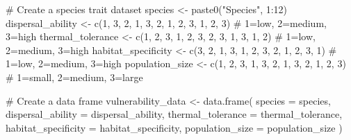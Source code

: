 \documentclass[
  letterpaper,
]{book}
\newenvironment{Shaded}{\begin{snugshade}}{\end{snugshade}}
\newcommand{\AttributeTok}[1]{\textcolor[rgb]{0.40,0.45,0.13}{#1}}
\newcommand{\CommentTok}[1]{\textcolor[rgb]{0.37,0.37,0.37}{#1}}
\newcommand{\DecValTok}[1]{\textcolor[rgb]{0.68,0.00,0.00}{#1}}
\newcommand{\FunctionTok}[1]{\textcolor[rgb]{0.28,0.35,0.67}{#1}}
\newcommand{\NormalTok}[1]{\textcolor[rgb]{0.00,0.23,0.31}{#1}}
\newcommand{\OtherTok}[1]{\textcolor[rgb]{0.00,0.23,0.31}{#1}}
\newcommand{\SpecialCharTok}[1]{\textcolor[rgb]{0.37,0.37,0.37}{#1}}
\newcommand{\StringTok}[1]{\textcolor[rgb]{0.13,0.47,0.30}{#1}}
\begin{document}
\begin{Shaded}
\begin{Highlighting}[]
\CommentTok{\# Create a species trait dataset}
\NormalTok{species }\OtherTok{\textless{}{-}} \FunctionTok{paste0}\NormalTok{(}\StringTok{"Species"}\NormalTok{, }\DecValTok{1}\SpecialCharTok{:}\DecValTok{12}\NormalTok{)}
\NormalTok{dispersal\_ability }\OtherTok{\textless{}{-}} \FunctionTok{c}\NormalTok{(}\DecValTok{1}\NormalTok{, }\DecValTok{3}\NormalTok{, }\DecValTok{2}\NormalTok{, }\DecValTok{1}\NormalTok{, }\DecValTok{3}\NormalTok{, }\DecValTok{2}\NormalTok{, }\DecValTok{1}\NormalTok{, }\DecValTok{2}\NormalTok{, }\DecValTok{3}\NormalTok{, }\DecValTok{1}\NormalTok{, }\DecValTok{2}\NormalTok{, }\DecValTok{3}\NormalTok{)  }\CommentTok{\# 1=low, 2=medium, 3=high}
\NormalTok{thermal\_tolerance }\OtherTok{\textless{}{-}} \FunctionTok{c}\NormalTok{(}\DecValTok{1}\NormalTok{, }\DecValTok{2}\NormalTok{, }\DecValTok{3}\NormalTok{, }\DecValTok{1}\NormalTok{, }\DecValTok{2}\NormalTok{, }\DecValTok{3}\NormalTok{, }\DecValTok{2}\NormalTok{, }\DecValTok{3}\NormalTok{, }\DecValTok{1}\NormalTok{, }\DecValTok{3}\NormalTok{, }\DecValTok{1}\NormalTok{, }\DecValTok{2}\NormalTok{)  }\CommentTok{\# 1=low, 2=medium, 3=high}
\NormalTok{habitat\_specificity }\OtherTok{\textless{}{-}} \FunctionTok{c}\NormalTok{(}\DecValTok{3}\NormalTok{, }\DecValTok{2}\NormalTok{, }\DecValTok{1}\NormalTok{, }\DecValTok{3}\NormalTok{, }\DecValTok{1}\NormalTok{, }\DecValTok{2}\NormalTok{, }\DecValTok{3}\NormalTok{, }\DecValTok{2}\NormalTok{, }\DecValTok{1}\NormalTok{, }\DecValTok{2}\NormalTok{, }\DecValTok{3}\NormalTok{, }\DecValTok{1}\NormalTok{)  }\CommentTok{\# 1=low, 2=medium, 3=high}
\NormalTok{population\_size }\OtherTok{\textless{}{-}} \FunctionTok{c}\NormalTok{(}\DecValTok{1}\NormalTok{, }\DecValTok{2}\NormalTok{, }\DecValTok{3}\NormalTok{, }\DecValTok{1}\NormalTok{, }\DecValTok{3}\NormalTok{, }\DecValTok{2}\NormalTok{, }\DecValTok{1}\NormalTok{, }\DecValTok{3}\NormalTok{, }\DecValTok{2}\NormalTok{, }\DecValTok{1}\NormalTok{, }\DecValTok{2}\NormalTok{, }\DecValTok{3}\NormalTok{)  }\CommentTok{\# 1=small, 2=medium, 3=large}

\CommentTok{\# Create a data frame}
\NormalTok{vulnerability\_data }\OtherTok{\textless{}{-}} \FunctionTok{data.frame}\NormalTok{(}
  \AttributeTok{species =}\NormalTok{ species,}
  \AttributeTok{dispersal\_ability =}\NormalTok{ dispersal\_ability,}
  \AttributeTok{thermal\_tolerance =}\NormalTok{ thermal\_tolerance,}
  \AttributeTok{habitat\_specificity =}\NormalTok{ habitat\_specificity,}
  \AttributeTok{population\_size =}\NormalTok{ population\_size}
\NormalTok{)}


\end{Highlighting}
\end{Shaded}
\end{document}
